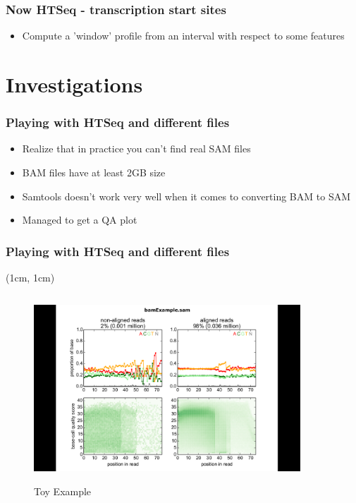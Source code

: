 \documentclass{beamer}
\begin{document}
\begin{frame}
    \frametitle{Now HTSeq - transcription start sites}
    \begin{itemize}
        \item Compute a 'window' profile from an interval with respect to some features
    \end{itemize}
\end{frame}


\section{Investigations}

\begin{frame}
    \frametitle{Playing with HTSeq and different files}
    \begin{itemize}
        \item Realize that in practice you can't find real SAM files
        \item BAM files have at least 2GB size
        \item Samtools doesn't work very well when it comes to converting BAM to SAM
        \item Managed to get a QA plot
    \end{itemize}
\end{frame}

\begin{frame}
    \frametitle{Playing with HTSeq and different files}
    \begin{textblock*}{10cm}(1cm, 1cm)
        \begin{figure}
            \includegraphics[width=10cm,height=7cm,keepaspectratio]{img/toyexample.png}
            \caption{Toy Example}
        \end{figure}
    \end{textblock*}
\end{frame}
\end{document}
